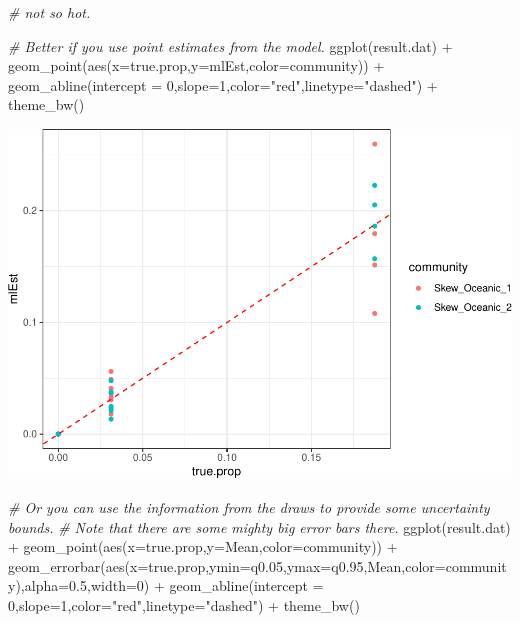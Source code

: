 \documentclass[
]{article}
\newenvironment{Shaded}{\begin{snugshade}}{\end{snugshade}}
\newcommand{\AttributeTok}[1]{\textcolor[rgb]{0.77,0.63,0.00}{#1}}
\newcommand{\CommentTok}[1]{\textcolor[rgb]{0.56,0.35,0.01}{\textit{#1}}}
\newcommand{\DecValTok}[1]{\textcolor[rgb]{0.00,0.00,0.81}{#1}}
\newcommand{\FloatTok}[1]{\textcolor[rgb]{0.00,0.00,0.81}{#1}}
\newcommand{\FunctionTok}[1]{\textcolor[rgb]{0.00,0.00,0.00}{#1}}
\newcommand{\NormalTok}[1]{#1}
\newcommand{\SpecialCharTok}[1]{\textcolor[rgb]{0.00,0.00,0.00}{#1}}
\newcommand{\StringTok}[1]{\textcolor[rgb]{0.31,0.60,0.02}{#1}}
\begin{document}
\begin{Shaded}
\begin{Highlighting}[]
\CommentTok{\# not so hot.}

\CommentTok{\# Better if you use point estimates from the model.}
\FunctionTok{ggplot}\NormalTok{(result.dat) }\SpecialCharTok{+}
    \FunctionTok{geom\_point}\NormalTok{(}\FunctionTok{aes}\NormalTok{(}\AttributeTok{x=}\NormalTok{true.prop,}\AttributeTok{y=}\NormalTok{mlEst,}\AttributeTok{color=}\NormalTok{community)) }\SpecialCharTok{+}
    \FunctionTok{geom\_abline}\NormalTok{(}\AttributeTok{intercept =} \DecValTok{0}\NormalTok{,}\AttributeTok{slope=}\DecValTok{1}\NormalTok{,}\AttributeTok{color=}\StringTok{"red"}\NormalTok{,}\AttributeTok{linetype=}\StringTok{"dashed"}\NormalTok{) }\SpecialCharTok{+}
    \FunctionTok{theme\_bw}\NormalTok{()}
\end{Highlighting}
\end{Shaded}

\includegraphics{Appendix_S4_files/figure-latex/stan_plots-2.pdf}

\begin{Shaded}
\begin{Highlighting}[]
\CommentTok{\# Or you can use the information from the draws to provide some uncertainty bounds.}
\CommentTok{\# Note that there are some mighty big error bars there.}
\FunctionTok{ggplot}\NormalTok{(result.dat) }\SpecialCharTok{+}
    \FunctionTok{geom\_point}\NormalTok{(}\FunctionTok{aes}\NormalTok{(}\AttributeTok{x=}\NormalTok{true.prop,}\AttributeTok{y=}\NormalTok{Mean,}\AttributeTok{color=}\NormalTok{community)) }\SpecialCharTok{+}
    \FunctionTok{geom\_errorbar}\NormalTok{(}\FunctionTok{aes}\NormalTok{(}\AttributeTok{x=}\NormalTok{true.prop,}\AttributeTok{ymin=}\NormalTok{q0}\FloatTok{.05}\NormalTok{,}\AttributeTok{ymax=}\NormalTok{q0}\FloatTok{.95}\NormalTok{,Mean,}\AttributeTok{color=}\NormalTok{community),}\AttributeTok{alpha=}\FloatTok{0.5}\NormalTok{,}\AttributeTok{width=}\DecValTok{0}\NormalTok{) }\SpecialCharTok{+}
    \FunctionTok{geom\_abline}\NormalTok{(}\AttributeTok{intercept =} \DecValTok{0}\NormalTok{,}\AttributeTok{slope=}\DecValTok{1}\NormalTok{,}\AttributeTok{color=}\StringTok{"red"}\NormalTok{,}\AttributeTok{linetype=}\StringTok{"dashed"}\NormalTok{) }\SpecialCharTok{+}
    \FunctionTok{theme\_bw}\NormalTok{()}
\end{Highlighting}
\end{Shaded}
\end{document}
